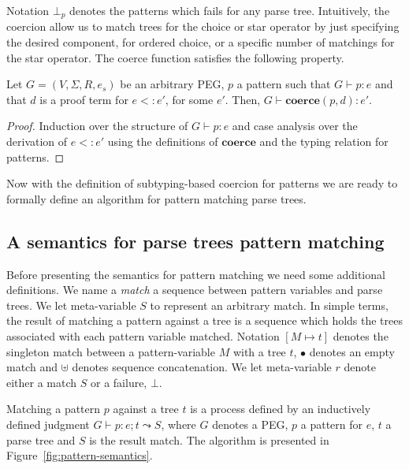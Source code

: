 Notation $\bot_p$ denotes the patterns which fails for any parse tree. Intuitively,
the coercion allow us to match trees for the choice or star operator by just specifying
the desired component, for ordered choice, or a specific number of matchings for the
star operator. The coerce function satisfies the following property.

\begin{theorem}\label{thm:coerce-correct}
  Let $G = (V,\Sigma, R, e_s)$ be an arbitrary PEG, $p$ a pattern such that
  $G\vdash p : e$ and that $d$ is a proof term for $e <: e'$, for some
  $e'$. Then, $G\vdash \mathbf{coerce}(p,d) : e'$.
\end{theorem}
\begin{proof}
  Induction over the structure of $G\vdash p : e$ and case analysis over
  the derivation of $e <: e'$ using the definitions of $\mathbf{coerce}$ and
  the typing relation for patterns.
\end{proof}

Now with the definition of subtyping-based coercion for patterns we are
ready to formally define an algorithm for pattern matching parse trees.

\subsection{A semantics for parse trees pattern matching}

Before presenting the semantics for pattern matching we need some additional
definitions. We name a \emph{match} a sequence between pattern variables
and parse trees. We let meta-variable $S$ to represent an arbitrary match.
In simple terms, the result of matching a pattern against a tree is a sequence
which holds the trees associated with each pattern variable matched.
Notation $[M \mapsto t]$ denotes the singleton match between
a pattern-variable $M$ with a tree $t$, $\bullet$ denotes an empty match and
$\uplus$ denotes sequence concatenation. We let meta-variable $r$
denote either a match $S$ or a failure, $\bot$.

Matching a pattern $p$ against a tree $t$ is a process defined by an inductively
defined judgment $G \vdash p : e; t \leadsto S$, where $G$ denotes a PEG,
$p$ a pattern for $e$, $t$ a parse tree and $S$ is the result match.
The algorithm is presented in Figure~\ref{fig:pattern-semantics}.

